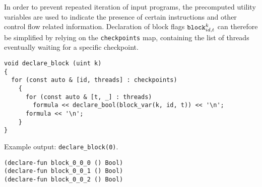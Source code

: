 

\noindent
In order to prevent repeated iteration of input programs,
the precomputed utility variables are used to indicate the presence of certain instructions and other control flow related information.
Declaration of block flags $\texttt{block}^k_{id, t}$ can therefore be simplified by relying on the \texttt{checkpoints} map,
containing the list of threads eventually waiting for a specific checkpoint.

\newpage

\begin{lstlisting}[style=c++]
void declare_block (uint k)
{
  for (const auto & [id, threads] : checkpoints)
    {
      for (const auto & [t, _] : threads)
        formula << declare_bool(block_var(k, id, t)) << '\n';
      formula << '\n';
    }
}
\end{lstlisting}

\noindent
Example output: \lstinline[style=c++]{declare_block(0)}.

\begin{lstlisting}[language=SMTLib]
(declare-fun block_0_0_0 () Bool)
(declare-fun block_0_0_1 () Bool)
(declare-fun block_0_0_2 () Bool)
\end{lstlisting}

